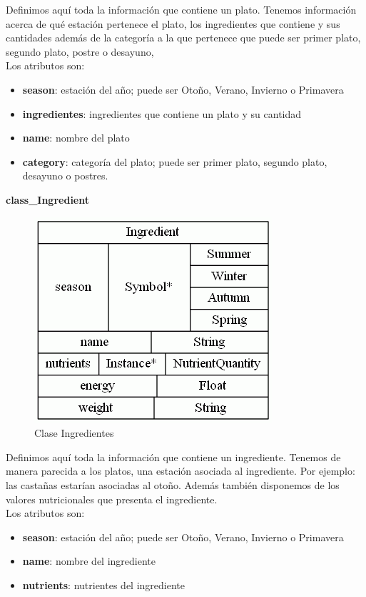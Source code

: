 \documentclass[12]{article}
\begin{document}
Definimos aquí toda la información que contiene un plato. Tenemos información acerca de qué estación pertenece el plato, los ingredientes que contiene y sus cantidades además de la categoría a la que pertenece que puede ser primer plato, segundo plato, postre o desayuno, 
\\

Los atributos son:
\begin{itemize}
\item \textbf{season}: estación del año; puede ser Otoño, Verano, Invierno o Primavera
\item \textbf{ingredientes}: ingredientes que contiene un plato y su cantidad
\item \textbf{name}: nombre del plato
\item \textbf{category}: categoría del plato; puede ser primer plato, segundo plato, desayuno o postres. 
\end{itemize}


\vspace{0.5cm}

\textbf{class\_Ingredient}
\begin{figure}[H]
\centering
\includegraphics[scale=0.5]{images/classIngredient.png}
\caption{Clase Ingredientes}
\label{ingredientes}
\end{figure}

Definimos aquí toda la información que contiene un ingrediente. Tenemos de manera parecida a los platos, una estación asociada al ingrediente. Por ejemplo: las castañas estarían asociadas al otoño. Además también disponemos de los valores nutricionales que presenta el ingrediente.
\\

Los atributos son: 

\begin{itemize}
\item \textbf{season}: estación del año; puede ser Otoño, Verano, Invierno o Primavera
\item \textbf{name}: nombre del ingrediente
\item \textbf{nutrients}: nutrientes del ingrediente
\end{itemize}
\end{document}
